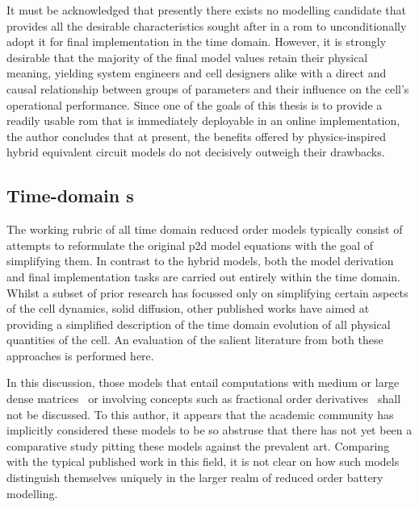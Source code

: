 It must be acknowledged that presently  there exists no modelling candidate that
provides  all the  desirable  characteristics  sought after  in  a \gls{rom}  to
unconditionally adopt it  for final implementation in the  time domain. However,
it is  strongly desirable  that the  majority of the  final model  values retain
their physical meaning, yielding system  engineers and cell designers alike with
a  direct  and  causal  relationship  between groups  of  parameters  and  their
influence on the cell's operational performance.  Since one of the goals of this
thesis is to  provide a readily usable \gls{rom} that  is immediately deployable
in an online implementation, the author  concludes that at present, the benefits
offered by physics-inspired  hybrid equivalent circuit models  do not decisively
outweigh their drawbacks.



\subsection{Time-domain s}
The working rubric of all time  domain reduced order models typically consist of
attempts to reformulate the original \gls{p2d}  model equations with the goal of
simplifying them.  In contrast to the  hybrid models, both the  model derivation
and  final  implementation  tasks  are  carried out  entirely  within  the  time
domain.  Whilst a  subset of  prior research  has focussed  only on  simplifying
certain aspects  of the  cell dynamics, \eg{}  solid diffusion,  other published
works  have aimed  at  providing a  simplified description  of  the time  domain
evolution of all  physical quantities of the cell. An  evaluation of the salient
literature  from both  these  approaches is  performed here.


In this discussion,  those models that entail computations with  medium or large
dense  matrices~\cite{Li2016,Xu2016,Corno2015}  or  involving concepts  such  as
fractional  order  derivatives~\cite{Sabatier2014,Sabatier2015, Li2017,  Mu2017,
Wang2017} shall not  be discussed. To this author, it  appears that the academic
community has  implicitly considered these models  to be so abstruse  that there
has not yet been a comparative  study pitting these models against the prevalent
art. Comparing with the typical published work in this field, it is not clear on
how such models  distinguish themselves uniquely in the larger  realm of reduced
order battery modelling.


